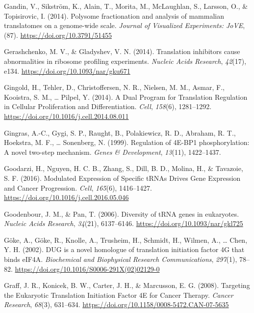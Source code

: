 \documentclass[12pt,openany]{book}
\begin{document}
\hypertarget{ref-Gandin2014}{}
Gandin, V., Sikström, K., Alain, T., Morita, M., McLaughlan, S.,
Larsson, O., \& Topisirovic, I. (2014). Polysome fractionation and
analysis of mammalian translatomes on a genome-wide scale. \emph{Journal
of Visualized Experiments: JoVE}, (87).
\url{https://doi.org/10.3791/51455}

\hypertarget{ref-Gerashchenko2014}{}
Gerashchenko, M. V., \& Gladyshev, V. N. (2014). Translation inhibitors
cause abnormalities in ribosome profiling experiments. \emph{Nucleic
Acids Research}, \emph{42}(17), e134.
\url{https://doi.org/10.1093/nar/gku671}

\hypertarget{ref-Gingold2014}{}
Gingold, H., Tehler, D., Christoffersen, N. R., Nielsen, M. M., Asmar,
F., Kooistra, S. M., \ldots{} Pilpel, Y. (2014). A Dual Program for
Translation Regulation in Cellular Proliferation and Differentiation.
\emph{Cell}, \emph{158}(6), 1281--1292.
\url{https://doi.org/10.1016/j.cell.2014.08.011}

\hypertarget{ref-Gingras1999}{}
Gingras, A.-C., Gygi, S. P., Raught, B., Polakiewicz, R. D., Abraham, R.
T., Hoekstra, M. F., \ldots{} Sonenberg, N. (1999). Regulation of 4E-BP1
phosphorylation: A novel two-step mechanism. \emph{Genes \&
Development}, \emph{13}(11), 1422--1437.

\hypertarget{ref-Goodarzi2016}{}
Goodarzi, H., Nguyen, H. C. B., Zhang, S., Dill, B. D., Molina, H., \&
Tavazoie, S. F. (2016). Modulated Expression of Specific tRNAs Drives
Gene Expression and Cancer Progression. \emph{Cell}, \emph{165}(6),
1416--1427. \url{https://doi.org/10.1016/j.cell.2016.05.046}

\hypertarget{ref-Goodenbour2006}{}
Goodenbour, J. M., \& Pan, T. (2006). Diversity of tRNA genes in
eukaryotes. \emph{Nucleic Acids Research}, \emph{34}(21), 6137--6146.
\url{https://doi.org/10.1093/nar/gkl725}

\hypertarget{ref-Goke2002}{}
Göke, A., Göke, R., Knolle, A., Trusheim, H., Schmidt, H., Wilmen, A.,
\ldots{} Chen, Y. H. (2002). DUG is a novel homologue of translation
initiation factor 4G that binds eIF4A. \emph{Biochemical and Biophysical
Research Communications}, \emph{297}(1), 78--82.
\url{https://doi.org/10.1016/S0006-291X(02)02129-0}

\hypertarget{ref-Graff2008}{}
Graff, J. R., Konicek, B. W., Carter, J. H., \& Marcusson, E. G. (2008).
Targeting the Eukaryotic Translation Initiation Factor 4E for Cancer
Therapy. \emph{Cancer Research}, \emph{68}(3), 631--634.
\url{https://doi.org/10.1158/0008-5472.CAN-07-5635}
\end{document}
